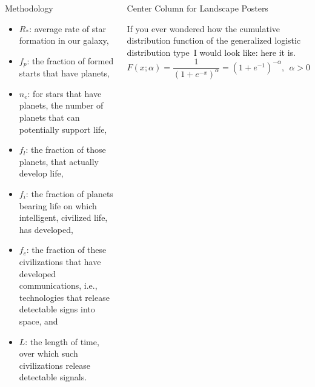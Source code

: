 \documentclass[final]{beamer}
\begin{document}
\begin{frame}[fragile]
\begin{columns}[t]
\begin{leftcolumn}
\begin{boxblock}{Methodology}
      \begin{footnotesize}
      \begin{itemize}
         \item $R_*$: average rate of star formation in our galaxy,
         \item $f_p$: the fraction of formed starts that have planets,
         \item $n_e$: for stars that have planets, the number of planets that
                      can potentially support life,
         \item $f_l$: the fraction of those planets, that actually develop life,
         \item $f_i$: the fraction of planets bearing life on which intelligent,
                      civilized life, has developed,
         \item $f_c$: the fraction of these civilizations that have developed
                      communications, i.e., technologies that release detectable
                      signs into space, and
         \item $L$: the length of time, over which such civilizations release detectable signals.
      \end{itemize}
      \end{footnotesize}
   \end{boxblock}

\end{leftcolumn} %


\iflandscape
   \begin{centercolumn}

      \begin{boxblock}{Center Column for Landscape Posters}

         If you ever wondered how the cumulative distribution function of
         the generalized logistic distribution type~I would look like: here it is.
         \begin{equation}
            F(x;\alpha) = \frac{1}{(1 + e^{-x})^\alpha} = (1 + e^{-1})^{-\alpha},~~\alpha > 0
         \end{equation}


\end{boxblock}
\end{centercolumn}
\end{columns}
\end{frame}
\end{document}
